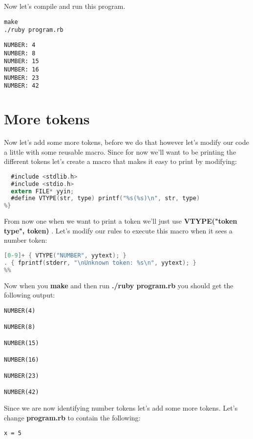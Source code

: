 {Now let's compile and run this program.

\begin{lstlisting}
make
./ruby program.rb
\end{lstlisting}

\begin{lstlisting}
NUMBER: 4
NUMBER: 8
NUMBER: 15
NUMBER: 16
NUMBER: 23
NUMBER: 42
\end{lstlisting}

\section{More tokens}

Now let's add some more tokens, before we do that however let's modify our code a little with some reusable macro. Since for now we'll want to be printing the different tokens let's create a macro that makes it easy to print by modifying:

\begin{lstlisting}[language=C]
%{
  #include <stdlib.h>
  #include <stdio.h>
  extern FILE* yyin;
  #define VTYPE(str, type) printf("%s(%s)\n", str, type)
%}
\end{lstlisting}

From now one when we want to print a token we'll just use {\bf VTYPE("token type", token) }. Let's modify our rules to execute this macro when it sees a number token:


\begin{lstlisting}[language=C]
%%
[0-9]+ { VTYPE("NUMBER", yytext); }
. { fprintf(stderr, "\nUnknown token: %s\n", yytext); }
%%
\end{lstlisting}

Now when you {\bf make} and then run {\bf ./ruby program.rb} you should get the following output:

\begin{lstlisting}
NUMBER(4)

NUMBER(8)

NUMBER(15)

NUMBER(16)

NUMBER(23)

NUMBER(42)

\end{lstlisting}

Since we are now identifying number tokens let's add some more tokens. Let's change {\bf program.rb} to contain the following:

\begin{lstlisting}
x = 5
\end{lstlisting}

}
